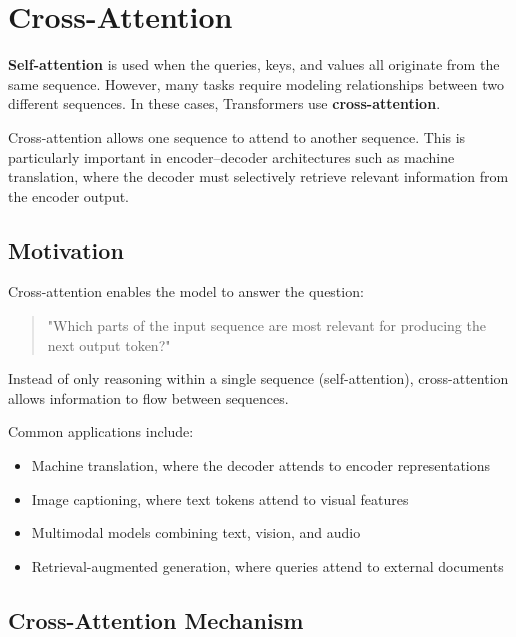 \documentclass[11pt]{article}
\begin{document}
\section{Cross-Attention}
\label{sec:cross-attention}

\textbf{Self-attention} is used when the queries, keys, and values all originate from the same sequence. However, many tasks require modeling relationships between two different sequences. In these cases, Transformers use \textbf{cross-attention}.

Cross-attention allows one sequence to attend to another sequence. This is particularly important in encoder–decoder architectures such as machine translation, where the decoder must selectively retrieve relevant information from the encoder output.

\subsection{Motivation}

Cross-attention enables the model to answer the question:

\begin{quote}
"Which parts of the input sequence are most relevant for producing the next output token?"
\end{quote}

Instead of only reasoning within a single sequence (self-attention), cross-attention allows information to flow between sequences.

Common applications include:

\begin{itemize}

\item Machine translation, where the decoder attends to encoder representations
\item Image captioning, where text tokens attend to visual features
\item Multimodal models combining text, vision, and audio
\item Retrieval-augmented generation, where queries attend to external documents

\end{itemize}

\subsection{Cross-Attention Mechanism}
\end{document}
